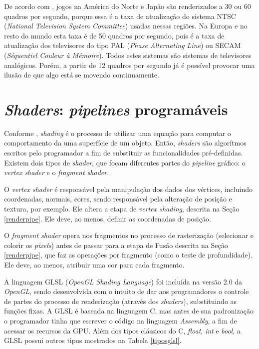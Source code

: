 	De acordo com \cite{framerate2009}, jogos na América do Norte e Japão são renderizados a 30 ou 60 quadros por segundo, porque essa é a taxa de atualização do sistema NTSC (\textit{National Television System Committee}) usadas nessas regiões. Na Europa e no resto do mundo esta taxa é de 50 quadros por segundo, pois é a taxa de atualização dos televisores do tipo PAL (\textit{Phase Alternating Line}) ou SECAM (\textit{Séquentiel Couleur à Mémoire}). Todos estes sistemas são sistemas de televisores analógicos. Porém, a partir de 12 quadros por segundo já é possível provocar uma ilusão de que algo está se movendo continuamente. 

\section{\textit{Shaders}: \textit{pipelines} programáveis}
	
	Conforme \cite{realtime}, \textit{shading} é o processo de utilizar uma equação para computar o comportamento da uma superfície de um objeto. Então, \textit{shaders} são algorítmos escritos pelo programador a fim de substituir as funcionalidades pré-definidas. Existem dois tipos de \textit{shader}, que focam diferentes partes do \textit{pipeline} gráfico: o \textit{vertex shader} e o \textit{fragment shader}. 

	O   \textit{vertex shader} é responsável pela manipulação dos dados dos vértices, incluindo coordenadas, normais, cores, sendo responsável pela alteração de posição e textura, por exemplo. Ele altera a etapa de \textit{vertex shading}, descrita na Seção \ref{renderpipe}. Ele deve, ao menos, definir as coordenadas de posição. 

	O \textit{fragment shader} opera nos fragmentos no processo de rasterização (selecionar e colorir os \textit{pixels}) antes de passar para a etapa de Fusão descrita na Seção \ref{renderpipe}, que faz as operações por fragmento (como o teste de profundidade). Ele deve, ao menos, atribuir uma cor para cada fragmento. 

	A linguagem GLSL (\textit{OpenGL Shading Language}) foi incluída na versão 2.0 da  \textit{OpenGL}, sendo desenvolvida com o intuito de dar aos programadores o controle de partes do processo de renderização (através dos \textit{shaders}), substituindo as funções fixas. A GLSL é baseada na linguagem C, mas antes de sua padronização o programador tinha que escrever o código na linguagem \textit{Assembly}, a fim de acessar os recursos da GPU. Além dos tipos clássicos do C, \textit{float}, \textit{int} e \textit{bool}, a GLSL possui outros tipos mostrados na Tabela \ref{tiposglsl}.

